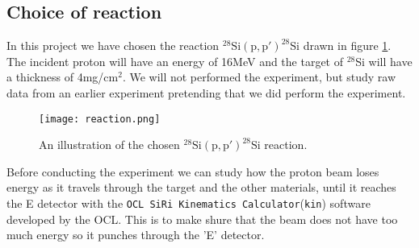\documentclass[11pt,a4wide]{article}
\begin{document}

\subsection{Choice of reaction}%
In this project we have chosen the reaction ${}^{28}\mathrm{Si(p,p')}^{28}\mathrm{Si}$ drawn in figure \ref{fig: reaction}. The incident proton will have an energy of 16MeV and the target of ${}^28$Si will have a thickness of 4mg/cm${}^2$. We will not performed the experiment, but study raw data from an earlier experiment pretending that we did perform the experiment. 

\begin{figure}[htp]
\centering
\texttt{[image: reaction.png]}
\caption{An illustration of the chosen ${}^{28}\mathrm{Si(p,p')}^{28}\mathrm{Si}$ reaction.}
\label{fig: reaction}
\end{figure}

Before conducting the experiment we can study how the proton beam loses energy as it travels through the target and the other materials, until it reaches the E detector with the \texttt{OCL SiRi Kinematics Calculator}(\texttt{kin}) software developed by the OCL. This is to make shure that the beam does not have too much energy so it punches through the 'E' detector. 


\end{document}
